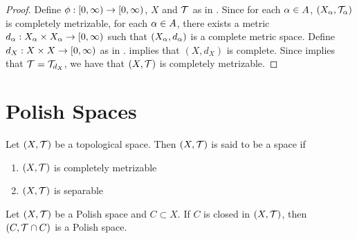 \documentclass{book}
\begin{document}
\begin{proof}
	Define $\phi: [0,\infty) \rightarrow [0,\infty)$, $X$ and $\mathcal{T}$ as in . Since for each $\alpha \in A$, $(X_{\alpha}, \mathcal{T}_{\alpha})$ is completely metrizable, for each $\alpha \in A$, there exists a metric $d_{\alpha}:X_{\alpha} \times X_{\alpha} \rightarrow [0,\infty)$ such that $(X_{\alpha}, d_{\alpha})$ is a complete metric space. Define $d_X:X \times X \rightarrow [0,\infty)$ as in .  implies that $(X, d_X)$ is complete. Since  implies that $\mathcal{T} = \mathcal{T}_{d_X}$, we have that $(X, \mathcal{T})$ is completely metrizable. 
\end{proof}
















































\newpage
\section{Polish Spaces}

\begin{defn} 
	Let $(X, \mathcal{T})$ be a topological space. Then $(X, \mathcal{T})$ is said to be a  space if 
	\begin{enumerate}
		\item $(X, \mathcal{T})$ is completely metrizable
		\item $(X, \mathcal{T})$ is separable
	\end{enumerate}
\end{defn}

\begin{ex} 
	Let $(X, \mathcal{T})$ be a Polish space and $C \subset X$. If $C$ is closed in $(X, \mathcal{T})$, then $(C, \mathcal{T} \cap C)$ is a Polish space.
\end{ex}
\end{document}
